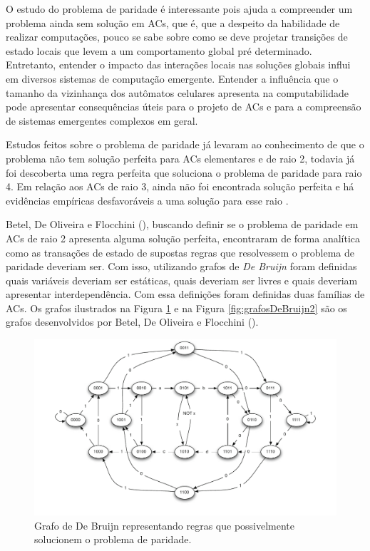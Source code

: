 \documentclass[12pt,a4paper]{article}
\begin{document}

O estudo do problema de paridade é interessante pois ajuda a compreender um problema ainda sem solução em ACs, que é, que a despeito da habilidade de realizar computações, pouco se sabe sobre como se deve projetar transições de estado locais que levem a um comportamento global pré determinado. Entretanto, entender o impacto das interações locais nas soluções globais influi em diversos sistemas de computação emergente. Entender a influência que o tamanho da vizinhança dos autômatos celulares apresenta na computabilidade pode apresentar consequências úteis para o projeto de ACs e para a compreensão de sistemas emergentes complexos em geral.

Estudos feitos sobre o problema de paridade já levaram ao conhecimento de que o problema não tem solução perfeita para ACs elementares e de raio 2, todavia já foi descoberta uma regra perfeita que soluciona o problema de paridade para raio 4. Em relação aos ACs de raio 3, ainda não foi encontrada solução perfeita e há evidências empíricas desfavoráveis a uma solução para esse raio \cite{Betel2013}.

Betel, De Oliveira e Flocchini (\citeyear{Betel2013}), buscando definir se o problema de paridade em ACs de raio 2 apresenta alguma solução perfeita, encontraram de forma analítica como as transações de estado de supostas regras que resolvessem o problema de paridade deveriam ser. Com isso, utilizando grafos de \textit{De Bruijn} foram definidas quais variáveis deveriam ser estáticas, quais deveriam ser livres e quais deveriam apresentar interdependência. Com essa definições foram definidas duas famílias de ACs. Os grafos ilustrados na Figura \ref{fig:grafosDeBruijn} e na Figura \ref{fig:grafosDeBruijn2} são os grafos desenvolvidos por Betel, De Oliveira e Flocchini (\citeyear{Betel2013}).

\begin{figure}[h!]
  \centering
  \includegraphics[width=.8\textwidth]{grafo1.pdf}
    \caption{Grafo de De Bruijn representando regras que possivelmente solucionem o problema de paridade.}
    \label{fig:grafosDeBruijn}
\end{figure}
\end{document}
